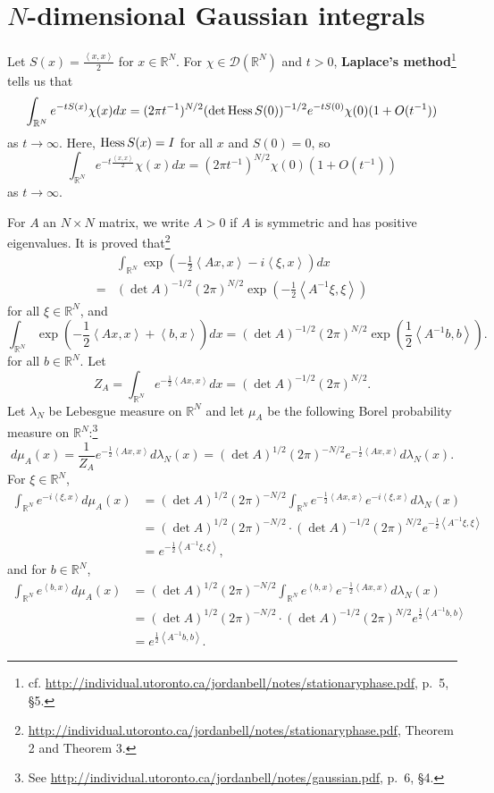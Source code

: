 \documentclass{article}
\newcommand{\inner}[2]{\left\langle #1, #2 \right\rangle}
\newcommand{\Hess}{\ensuremath\mathrm{Hess}\,}
\theoremstyle{definition}
\begin{document}
\section{$N$-dimensional Gaussian integrals}
Let $S(x) = \frac{\inner{x}{x}}{2}$ for $x \in \mathbb{R}^N$. 
For $\chi \in \mathscr{D}(\mathbb{R}^N)$ and $t>0$,
\textbf{Laplace's method}\footnote{cf.
\url{http://individual.utoronto.ca/jordanbell/notes/stationaryphase.pdf}, p.~5, \S 5.}
tells us that 
\[
\int_{\mathbb{R}^N} e^{-tS(x)} \chi(x) dx 
= (2\pi t^{-1})^{N/2} (\det \Hess S(0))^{-1/2} e^{-tS(0)} \chi(0) (1+O(t^{-1}))
\]
as $t \to \infty$. 
Here, $\Hess S(x) = I$ for all $x$ and $S(0)=0$, so
\[
\int_{\mathbb{R}^N} e^{-t \frac{\inner{x}{x}}{2}} \chi(x) dx = (2\pi t^{-1})^{N/2} \chi(0) (1+O(t^{-1}))
\]
as $t \to \infty$. 

For $A$ an $N \times N$ matrix, we write $A>0$ if $A$ is symmetric and has positive eigenvalues.
 It
 is proved that\footnote{\url{http://individual.utoronto.ca/jordanbell/notes/stationaryphase.pdf},
Theorem 2 and Theorem 3.}
\[
\begin{split}
&\int_{\mathbb{R}^N} \exp\left(-\frac{1}{2} \inner{Ax}{x} - i\inner{\xi}{x} \right) dx\\
=&(\det A)^{-1/2} (2\pi)^{N/2} \exp\left( -\frac{1}{2} \inner{A^{-1} \xi}{\xi} \right)
\end{split}
\]
for all $\xi \in \mathbb{R}^N$, and 
\[
\int_{\mathbb{R}^N} \exp\left(-\frac{1}{2}\inner{Ax}{x}+\inner{b}{x}\right) dx = (\det A)^{-1/2} (2\pi)^{N/2}
\exp\left(\frac{1}{2}\inner{A^{-1}b}{b}\right).
\]
for all $b \in \mathbb{R}^N$. 
Let
\[
Z_A = \int_{\mathbb{R}^N} e^{-\frac{1}{2}\inner{Ax}{x}} dx
=(\det A)^{-1/2} (2\pi)^{N/2}.
\]
Let $\lambda_N$ be Lebesgue measure on $\mathbb{R}^N$ and
let $\mu_A$ be the following Borel probability measure on $\mathbb{R}^N$:\footnote{See \url{http://individual.utoronto.ca/jordanbell/notes/gaussian.pdf},
p.~6, \S 4.}
\[
d\mu_A(x) = \frac{1}{Z_A} e^{-\frac{1}{2}\inner{Ax}{x}} d\lambda_N(x)
=(\det A)^{1/2} (2\pi)^{-N/2} e^{-\frac{1}{2}\inner{Ax}{x}} d\lambda_N(x).
\]
For $\xi \in \mathbb{R}^N$, 
\begin{align*}
\int_{\mathbb{R}^N} e^{-i\inner{\xi}{x}} d\mu_A(x)&=
(\det A)^{1/2} (2\pi)^{-N/2} \int_{\mathbb{R}^N} e^{-\frac{1}{2}\inner{Ax}{x}} e^{-i\inner{\xi}{x}} d\lambda_N(x)\\
&=(\det A)^{1/2} (2\pi)^{-N/2}  \cdot (\det A)^{-1/2} (2\pi)^{N/2} e^{-\frac{1}{2}\inner{A^{-1}\xi}{\xi}}\\
&=e^{-\frac{1}{2}\inner{A^{-1}\xi}{\xi}},
\end{align*}
and for $b \in \mathbb{R}^N$,
\begin{align*}
\int_{\mathbb{R}^N} e^{\inner{b}{x}} d\mu_A(x)&=
(\det A)^{1/2} (2\pi)^{-N/2}  \int_{\mathbb{R}^N} e^{\inner{b}{x}}
e^{-\frac{1}{2}\inner{Ax}{x}} d\lambda_N(x)\\
&=(\det A)^{1/2} (2\pi)^{-N/2}   \cdot
(\det A)^{-1/2} (2\pi)^{N/2}
e^{\frac{1}{2}\inner{A^{-1}b}{b}}\\
&=e^{\frac{1}{2}\inner{A^{-1}b}{b}}.
\end{align*}
\end{document}
